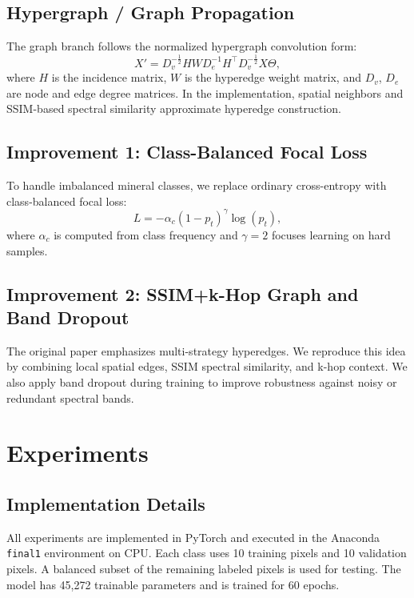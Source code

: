 \documentclass[conference]{IEEEtran}
\begin{document}
\subsection{Hypergraph / Graph Propagation}
The graph branch follows the normalized hypergraph convolution form:
\begin{equation}
    X' = D_v^{-\frac12} H W D_e^{-1} H^\top D_v^{-\frac12} X \Theta ,
    \label{eq:hypergraph}
\end{equation}
where $H$ is the incidence matrix, $W$ is the hyperedge weight matrix, and $D_v$, $D_e$ are node and edge degree matrices. In the implementation, spatial neighbors and SSIM-based spectral similarity approximate hyperedge construction.

\subsection{Improvement 1: Class-Balanced Focal Loss}
To handle imbalanced mineral classes, we replace ordinary cross-entropy with class-balanced focal loss:
\begin{equation}
    L = -\alpha_c (1-p_t)^\gamma \log(p_t),
    \label{eq:focal}
\end{equation}
where $\alpha_c$ is computed from class frequency and $\gamma=2$ focuses learning on hard samples.

\subsection{Improvement 2: SSIM+k-Hop Graph and Band Dropout}
The original paper emphasizes multi-strategy hyperedges. We reproduce this idea by combining local spatial edges, SSIM spectral similarity, and k-hop context. We also apply band dropout during training to improve robustness against noisy or redundant spectral bands.

\section{Experiments}
\subsection{Implementation Details}
All experiments are implemented in PyTorch and executed in the Anaconda \texttt{final1} environment on CPU. Each class uses 10 training pixels and 10 validation pixels. A balanced subset of the remaining labeled pixels is used for testing. The model has 45,272 trainable parameters and is trained for 60 epochs.
\end{document}
